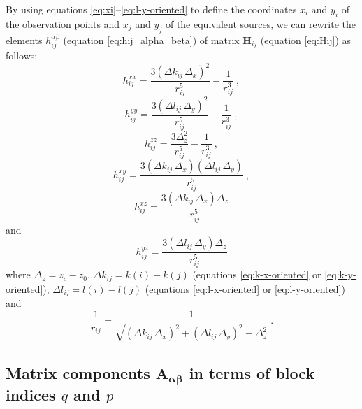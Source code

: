 By using equations \ref{eq:xi}--\ref{eq:l-y-oriented} to define the coordinates $x_{i}$ and 
$y_{i}$ of the observation points and $x_{j}$ and $y_{j}$ of the equivalent sources, we can
rewrite the elements $h^{\alpha\beta}_{ij}$ (equation \ref{eq:hij_alpha_beta}) of matrix 
$\mathbf{H}_{ij}$ (equation \ref{eq:Hij}) as follows:
\begin{equation}
h^{xx}_{ij} = 
\frac{3 \left( \Delta k_{ij} \, \Delta_{x} \right)^{2}}{r_{ij}^{5}} - \frac{1}{r_{ij}^{3}} \: ,
\label{eq:hxx_regular}
\end{equation}
\begin{equation}
h^{yy}_{ij} = 
\frac{3 \left( \Delta l_{ij} \, \Delta_{y} \right)^{2}}{r_{ij}^{5}} - \frac{1}{r_{ij}^{3}} \: ,
\label{eq:hyy_regular}
\end{equation}
\begin{equation}
h^{zz}_{ij} = 
\frac{3 \Delta_{z}^{2}}{r_{ij}^{5}} - \frac{1}{r_{ij}^{3}} \: ,
\label{eq:hzz_regular}
\end{equation}
\begin{equation}
h^{xy}_{ij} = 
\frac{3 \left( \Delta k_{ij} \, \Delta_{x} \right)\left( \Delta l_{ij} \, \Delta_{y} \right)}{r_{ij}^{5}} \: ,
\label{eq:hxy_regular}
\end{equation}
\begin{equation}
h^{xz}_{ij} = 
\frac{3 \left( \Delta k_{ij} \, \Delta_{x} \right) \Delta_{z}}{r_{ij}^{5}}
\label{eq:hxz_regular}
\end{equation}
and
\begin{equation}
h^{yz}_{ij} = 
\frac{3 \left( \Delta l_{ij} \, \Delta_{y} \right) \Delta_{z}}{r_{ij}^{5}}
\label{eq:hyz_regular}
\end{equation}
where $\Delta_{z} = z_{c} - z_{0}$, $\Delta k_{ij} = k(i) - k(j)$ (equations \ref{eq:k-x-oriented} or \ref{eq:k-y-oriented}), $\Delta l_{ij} = l(i) - l(j)$ (equations \ref{eq:l-x-oriented} or \ref{eq:l-y-oriented}) and
\begin{equation}
\frac{1}{r_{ij}} = 
\frac{1}{\sqrt{\left( \Delta k_{ij} \, \Delta_{x} \right)^{2} + \left( \Delta l_{ij} \, \Delta_{y} \right)^{2} + \Delta_{z}^{2}}} \: .
\label{eq:1_rij_regular}
\end{equation}

\subsection{Matrix components $\mathbf{A_{\boldsymbol{\alpha\beta}}}$ in terms of block indices $q$ and $p$}

